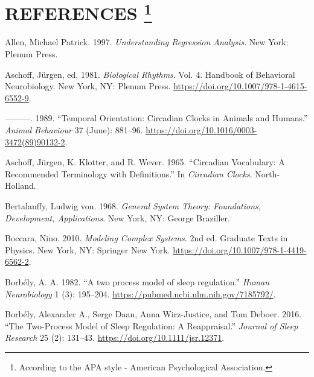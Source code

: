 \documentclass[
  12pt,
  a4paper,
  oneside]{tesesusp}
\newlength{\cslhangindent}
\newlength{\cslentryspacingunit} %
\newenvironment{CSLReferences}[2] %
 {%
  \setlength{\parindent}{0pt}
  \ifodd #1
  \let\oldpar\par
  \def\par{\hangindent=\cslhangindent\oldpar}
  \fi
  \setlength{\parskip}{#2\cslentryspacingunit}
 }%
 {}
\begin{document}

\hypertarget{references-1}{%
\chapter*{\texorpdfstring{REFERENCES
\footnote{According to the APA style - American Psychological
  Association.}}{REFERENCES }}\label{references-1}}


\postextual

\hypertarget{refs}{}
\begin{CSLReferences}{1}{0}
\leavevmode{}%
Allen, Michael Patrick. 1997. \emph{Understanding Regression Analysis}.
New York: Plenum Press.

\leavevmode{}%
Aschoff, Jürgen, ed. 1981. \emph{Biological Rhythms}. Vol. 4. Handbook
of Behavioral Neurobiology. New York, NY: Plenum Press.
\url{https://doi.org/10.1007/978-1-4615-6552-9}.

\leavevmode{}%
---------. 1989. {``Temporal Orientation: Circadian Clocks in Animals
and Humans.''} \emph{Animal Behaviour} 37 (June): 881--96.
\url{https://doi.org/10.1016/0003-3472(89)90132-2}.

\leavevmode{}%
Aschoff, Jürgen, K. Klotter, and R. Wever. 1965. {``Circadian
Vocabulary: A Recommended Terminology with Definitions.''} In
\emph{Circadian Clocks}. North-Holland.

\leavevmode{}%
Bertalanffy, Ludwig von. 1968. \emph{General System Theory: Foundations,
Development, Applications}. New York, NY: George Braziller.

\leavevmode{}%
Boccara, Nino. 2010. \emph{Modeling Complex Systems}. 2nd ed. Graduate
Texts in Physics. New York, NY: Springer New York.
\url{https://doi.org/10.1007/978-1-4419-6562-2}.

\leavevmode{}%
Borbély, A. A. 1982. {``A two process model of sleep regulation.''}
\emph{Human Neurobiology} 1 (3): 195--204.
\url{https://pubmed.ncbi.nlm.nih.gov/7185792/}.

\leavevmode{}%
Borbély, Alexander A., Serge Daan, Anna Wirz-Justice, and Tom Deboer.
2016. {``The Two-Process Model of Sleep Regulation: A Reappraisal.''}
\emph{Journal of Sleep Research} 25 (2): 131--43.
\url{https://doi.org/10.1111/jsr.12371}.


\end{CSLReferences}
\end{document}
